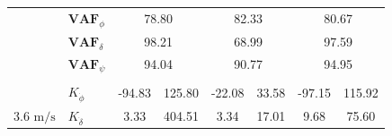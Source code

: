 \begin{table}[]
\begin{tabular}{llcccccc}
                                                   & $\mathbf{VAF}_\phi$                                    & \multicolumn{2}{c}{78.80}                                                                          & \multicolumn{2}{c}{82.33}                                                                          & \multicolumn{2}{c}{80.67}                                                                          \\
                                                   & $\mathbf{VAF}_\delta$                                  & \multicolumn{2}{c}{98.21}                                                                          & \multicolumn{2}{c}{68.99}                                                                          & \multicolumn{2}{c}{97.59}                                                                          \\
                                                   & $\mathbf{VAF}_\psi$                                    & \multicolumn{2}{c}{94.04}                                                                          & \multicolumn{2}{c}{90.77}                                                                          & \multicolumn{2}{c}{94.95}                                                                          \\
                                                   &                                                        & \multicolumn{1}{l}{}                        & \multicolumn{1}{l}{}                                 & \multicolumn{1}{l}{}                        & \multicolumn{1}{l}{}                                 & \multicolumn{1}{l}{}                        & \multicolumn{1}{l}{}                                 \\ \hline
                                                   & $K_{\dot{\phi}} $                                      & -94.83                                      & 125.80                                               & -22.08                                      & 33.58                                                & -97.15                                      & 115.92                                               \\
    \multirow{-2}{*}{3.6 $\si{\meter\per\second}$} & $K_{\dot{\delta}}$                                     & 3.33                                        & 404.51                                               & 3.34                                        & 17.01                                                & 9.68                                        & 75.60                                                \\

\end{tabular}
\end{table}
